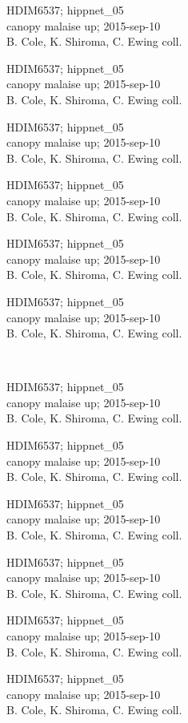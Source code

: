 \documentclass[2pt]{extarticle}
\begin{document}
\noindent
\parbox{0.16\textwidth}{\tiny \raggedright \rule[-0.3\baselineskip]{0pt}{10pt}HDIM6537; hippnet\_05\\ canopy malaise up; 2015-sep-10\\ B. Cole, K. Shiroma, C. Ewing coll.}
\parbox{0.16\textwidth}{\tiny \raggedright \rule[-0.3\baselineskip]{0pt}{10pt}HDIM6537; hippnet\_05\\ canopy malaise up; 2015-sep-10\\ B. Cole, K. Shiroma, C. Ewing coll.}
\parbox{0.16\textwidth}{\tiny \raggedright \rule[-0.3\baselineskip]{0pt}{10pt}HDIM6537; hippnet\_05\\ canopy malaise up; 2015-sep-10\\ B. Cole, K. Shiroma, C. Ewing coll.}
\parbox{0.16\textwidth}{\tiny \raggedright \rule[-0.3\baselineskip]{0pt}{10pt}HDIM6537; hippnet\_05\\ canopy malaise up; 2015-sep-10\\ B. Cole, K. Shiroma, C. Ewing coll.}
\parbox{0.16\textwidth}{\tiny \raggedright \rule[-0.3\baselineskip]{0pt}{10pt}HDIM6537; hippnet\_05\\ canopy malaise up; 2015-sep-10\\ B. Cole, K. Shiroma, C. Ewing coll.}
\parbox{0.16\textwidth}{\tiny \raggedright \rule[-0.3\baselineskip]{0pt}{10pt}HDIM6537; hippnet\_05\\ canopy malaise up; 2015-sep-10\\ B. Cole, K. Shiroma, C. Ewing coll.} \\ 
\vspace{0.001in} 

\noindent
\parbox{0.16\textwidth}{\tiny \raggedright \rule[-0.3\baselineskip]{0pt}{10pt}HDIM6537; hippnet\_05\\ canopy malaise up; 2015-sep-10\\ B. Cole, K. Shiroma, C. Ewing coll.}
\parbox{0.16\textwidth}{\tiny \raggedright \rule[-0.3\baselineskip]{0pt}{10pt}HDIM6537; hippnet\_05\\ canopy malaise up; 2015-sep-10\\ B. Cole, K. Shiroma, C. Ewing coll.}
\parbox{0.16\textwidth}{\tiny \raggedright \rule[-0.3\baselineskip]{0pt}{10pt}HDIM6537; hippnet\_05\\ canopy malaise up; 2015-sep-10\\ B. Cole, K. Shiroma, C. Ewing coll.}
\parbox{0.16\textwidth}{\tiny \raggedright \rule[-0.3\baselineskip]{0pt}{10pt}HDIM6537; hippnet\_05\\ canopy malaise up; 2015-sep-10\\ B. Cole, K. Shiroma, C. Ewing coll.}
\parbox{0.16\textwidth}{\tiny \raggedright \rule[-0.3\baselineskip]{0pt}{10pt}HDIM6537; hippnet\_05\\ canopy malaise up; 2015-sep-10\\ B. Cole, K. Shiroma, C. Ewing coll.}
\parbox{0.16\textwidth}{\tiny \raggedright \rule[-0.3\baselineskip]{0pt}{10pt}HDIM6537; hippnet\_05\\ canopy malaise up; 2015-sep-10\\ B. Cole, K. Shiroma, C. Ewing coll.} \\ 
\vspace{0.001in} 
\end{document}
